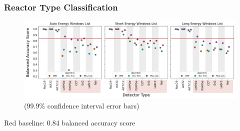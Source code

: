 \begin{frame}
  \frametitle{Reactor Type Classification}
  \begin{adjustwidth}{-15pt}{-10pt}
  \begin{figure}
    \centering
    \includegraphics[width=1.1\textwidth]{./figures/detector_preds_wrt_enlist_BalAcc_rxtr.png}
    \scriptsize (99.9\% confidence interval error bars)
  \end{figure}
  \vspace{12pt} \centering Red baseline: 0.84 balanced accuracy score
  \end{adjustwidth}
\end{frame}

